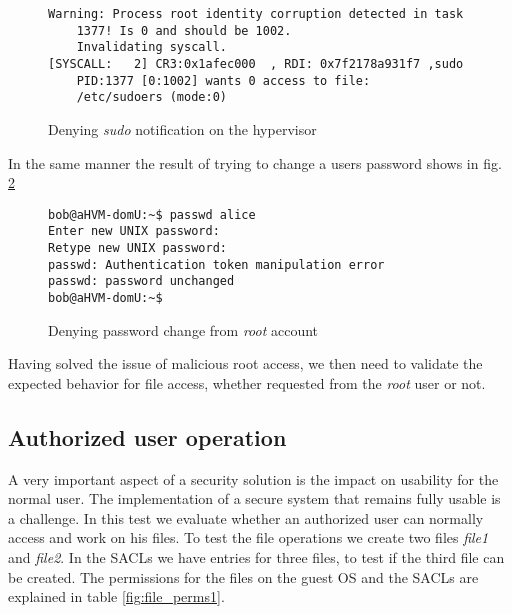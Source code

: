 \begin{figure}[ht]
	\centering
	\footnotesize{\selectfont 
		\begin{lstlisting}
Warning: Process root identity corruption detected in task 
	1377! Is 0 and should be 1002. 
	Invalidating syscall.
[SYSCALL:   2] CR3:0x1afec000  , RDI: 0x7f2178a931f7 ,sudo 
	PID:1377 [0:1002] wants 0 access to file: 
	/etc/sudoers (mode:0)
		\end{lstlisting}}
	\caption{Denying \emph{sudo} notification on the hypervisor}
	\label{fig:sudo_deny_not}
\end{figure}

\par In the same manner the result of trying to change a users password shows in fig. \ref{fig:passwd_deny}

\begin{figure}[ht]
	\centering
	\footnotesize{\selectfont 
		\begin{lstlisting}
bob@aHVM-domU:~$ passwd alice
Enter new UNIX password:
Retype new UNIX password:
passwd: Authentication token manipulation error
passwd: password unchanged
bob@aHVM-domU:~$
		\end{lstlisting}}
	\caption{Denying password change from \emph{root} account}
	\label{fig:passwd_deny}
\end{figure}


\par Having solved the issue of malicious root access, we then need to validate the expected behavior for file access, whether requested from the \emph{root} user or not.

\subsection{Authorized user operation}

\par A very important aspect of a security solution is the impact on usability for the normal user. The implementation of a secure system that remains fully usable is a challenge. In this test we evaluate whether an authorized user can normally access and work on his files. To test the file operations we create two files \emph{file1} and \emph{file2}. In the \acp{SACL} we have entries for three files, to test if the third file can be created. The permissions for the files on the guest \ac{OS} and the \acp{SACL} are explained in table \ref{fig:file_perms1}.

